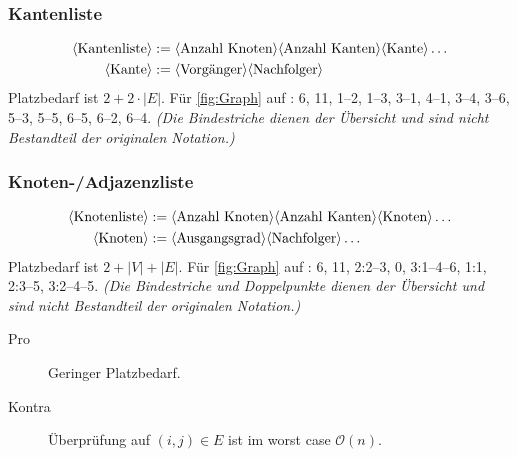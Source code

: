 \subsubsection{Kantenliste}
\begin{align*}
  \langle \hbox{Kantenliste} \rangle & :=
  \langle \hbox{Anzahl Knoten} \rangle
  \langle \hbox{Anzahl Kanten} \rangle
  \langle \hbox{Kante} \rangle\ldots \\
  \langle \hbox{Kante} \rangle & :=
  \langle\hbox{Vorgänger}\rangle
  \langle\hbox{Nachfolger}\rangle
\end{align*}
Platzbedarf ist $2 + 2 \cdot \lvert E \rvert$.
Für \cref{fig:Graph} auf : 6, 11, 1--2, 1--3, 3--1, 4--1, 3--4, 3--6, 5--3, 5--5, 6--5, 6--2, 6--4.
\emph{(Die Bindestriche dienen der Übersicht und sind nicht Bestandteil der originalen Notation.)}

\subsubsection{Knoten-/Adjazenzliste}
\begin{align*}
  \langle \hbox{Knotenliste} \rangle & :=
  \langle \hbox{Anzahl Knoten} \rangle
  \langle \hbox{Anzahl Kanten} \rangle
  \langle \hbox{Knoten} \rangle\ldots \\
  \langle \hbox{Knoten} \rangle & :=
  \langle\hbox{Ausgangsgrad}\rangle
  \langle\hbox{Nachfolger}\rangle\ldots
\end{align*}
Platzbedarf ist $2 + \lvert V \rvert + \lvert E \rvert$.
Für \cref{fig:Graph} auf : 6, 11, 2:2--3, 0, 3:1--4--6, 1:1, 2:3--5, 3:2--4--5.
\emph{(Die Bindestriche und Doppelpunkte dienen der Übersicht und sind nicht Bestandteil der originalen Notation.)}

\begin{description}
  \item[Pro] Geringer Platzbedarf.
  \item[Kontra] Überprüfung auf $(i,j) \in E$ ist im worst case $\mathcal{O}(n)$.
\end{description}

